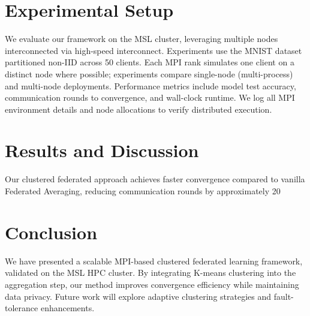 \section{Experimental Setup}
We evaluate our framework on the MSL cluster, leveraging multiple nodes interconnected via high-speed interconnect. Experiments use the MNIST dataset partitioned non-IID across 50 clients. Each MPI rank simulates one client on a distinct node where possible; experiments compare single-node (multi-process) and multi-node deployments. Performance metrics include model test accuracy, communication rounds to convergence, and wall-clock runtime. We log all MPI environment details and node allocations to verify distributed execution.

\section{Results and Discussion}
Our clustered federated approach achieves faster convergence compared to vanilla Federated Averaging, reducing communication rounds by approximately 20%

\section{Conclusion}
We have presented a scalable MPI-based clustered federated learning framework, validated on the MSL HPC cluster. By integrating K-means clustering into the aggregation step, our method improves convergence efficiency while maintaining data privacy. Future work will explore adaptive clustering strategies and fault-tolerance enhancements.

